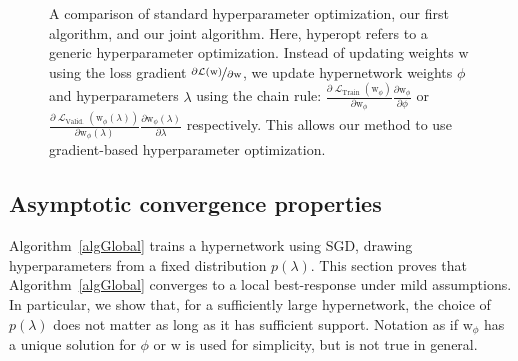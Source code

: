 \documentclass{article} %
\newcommand{\param}{\mathrm{w}} %
\newcommand{\hyper}{\lambda} %
\newcommand{\lossSymbol}{\mathop{\mathcal{L}}} %
\newcommand{\lossSymbolInner}{\lossSymbol_{\mathrm{Train}}} %
\newcommand{\lossSymbolOuter}{\lossSymbol_{\mathrm{Valid.}}} %
\newcommand{\outerUpdateSymbol}{\textrm{hyperopt}} %
\newcommand{\responseParam}{\phi} %
\newcommand{\responseParamFixed}{\responseParam} %
\begin{document}
\begin{figure}[t]
\caption*{A comparison of standard hyperparameter optimization, our first algorithm, and our joint algorithm.
Here, $\outerUpdateSymbol$ refers to a generic hyperparameter optimization.
Instead of updating weights $\param$ using the loss gradient $\nicefrac{\partial \mathcal{L}(\param)}{\partial \param}$, we update hypernetwork weights $\responseParamFixed$ and hyperparameters $\hyper$ using the chain rule: $\frac{\partial \lossSymbolInner (\param_\responseParamFixed)}{\partial \param_\responseParamFixed} \frac{\partial \param_\responseParamFixed}{\partial \responseParamFixed}$ or $\frac{\partial \lossSymbolOuter (\param_\responseParamFixed (\hyper))}{\partial \param_\responseParamFixed (\hyper)} \frac{\partial \param_\responseParamFixed (\hyper) }{\partial \hyper}$ respectively.
This allows our method to use gradient-based hyperparameter optimization.
}
\label{compare with cv}
\end{figure}


\subsection{Asymptotic convergence properties}
Algorithm~\ref{algGlobal} trains a hypernetwork using SGD, drawing hyperparameters from a fixed distribution $p(\lambda)$.
This section proves that Algorithm~\ref{algGlobal} converges to a local best-response under mild assumptions.
In particular, we show that, for a sufficiently large hypernetwork, the choice of $p(\lambda)$ does not matter as long as it has sufficient support.
Notation as if $\param_{\responseParam}$ has a unique solution for $\responseParam$ or $\param$ is used for simplicity, but is not true in general.
 
\end{document}
